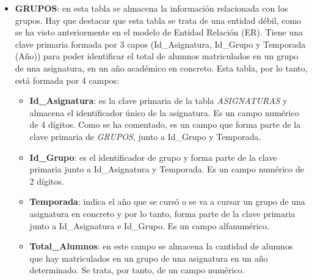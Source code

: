 \begin{itemize}
\item
\textbf{GRUPOS}: en esta tabla se almacena la información relacionada con los grupos. Hay que destacar que esta tabla se trata de una entidad débil, como se ha visto anteriormente en el modelo de Entidad Relación (ER). Tiene una clave primaria formada por 3 capos (Id\_Asignatura, Id\_Grupo y Temporada (Año)) para poder identificar el total de alumnos matriculados en un grupo de una asignatura, en un año académico en concreto. Esta tabla, por lo tanto, está formada por 4 campos:
\begin{itemize}
\item
\textbf{Id\_Asignatura}: es la clave primaria de la tabla \emph{ASIGNATURAS} y almacena el identificador único de la asignatura. Es un campo numérico de 4 dígitos. Como se ha comentado, es un campo que forma parte de la clave primaria de \emph{GRUPOS}, junto a  Id\_Grupo y Temporada.
\item
\textbf{Id\_Grupo}: es el identificador de grupo y forma parte de la clave primaria junto a  Id\_Asignatura y Temporada. Es un campo numérico de 2 dígitos.
\item
\textbf{Temporada}: indica el año que se cursó o se va a cursar un grupo de una asignatura en concreto y por lo tanto, forma parte de la clave primaria junto a  Id\_Asignatura e Id\_Grupo. Es un campo alfanumérico.
\item
\textbf{Total\_Alumnos}: en este campo se almacena la cantidad de alumnos que hay matriculados en un grupo de una asignatura en un año determinado. Se trata, por tanto, de un campo numérico.
\end{itemize}






\end{itemize}
